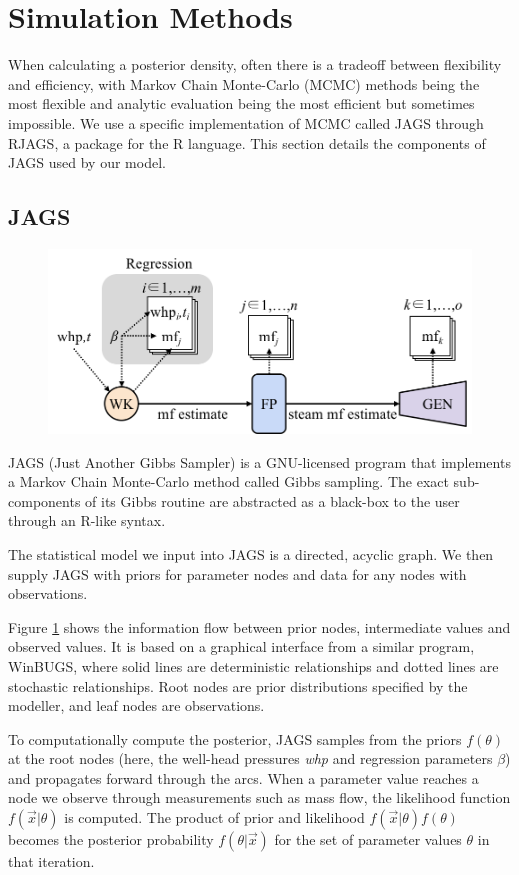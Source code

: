 \documentclass[a4paper, 12pt]{article}
\begin{document}
\section{Simulation Methods}
When calculating a posterior density, often there is a tradeoff between flexibility and efficiency, with Markov Chain Monte-Carlo (MCMC) methods being the most flexible and analytic evaluation being the most efficient but sometimes impossible. We use a specific implementation of MCMC called JAGS through RJAGS, a package for the R language. This section details the components of JAGS used by our model.

\subsection{JAGS}

\begin{figure}
  \centering
  \includegraphics[width=0.5\linewidth]{media/jags_diagram}
  \label{fig:jags_diagram}
\end{figure}

JAGS (Just Another Gibbs Sampler) is a GNU-licensed program that implements a Markov Chain Monte-Carlo method called Gibbs sampling. The exact sub-components of its Gibbs routine are abstracted as a black-box to the user through an R-like syntax.

The statistical model we input into JAGS is a directed, acyclic graph. We then supply JAGS with priors for parameter nodes and data for any nodes with observations.

Figure \ref{fig:jags_diagram} shows the information flow between prior nodes, intermediate values and observed values. It is based on a graphical interface from a similar program, WinBUGS, where solid lines are deterministic relationships and dotted lines are stochastic relationships. Root nodes are prior distributions specified by the modeller, and leaf nodes are observations. 

To computationally compute the posterior, JAGS samples from the priors $f(\theta)$ at the root nodes (here, the well-head pressures \emph{whp} and regression parameters $\beta$) and propagates forward through the arcs. When a parameter value reaches a node we observe through measurements such as mass flow, the likelihood function $f(\vec{x}|\theta)$ is computed. The product of prior and likelihood $f(\vec{x}|\theta)f(\theta)$ becomes the posterior probability $f(\theta|\vec{x})$ for the set of parameter values $\theta$ in that iteration.
\end{document}
